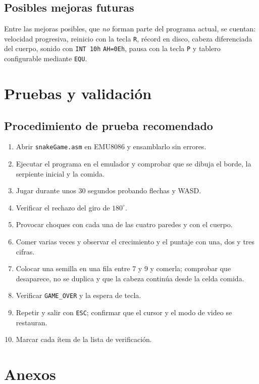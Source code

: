 \documentclass[10pt]{article}
\begin{document}
\subsection{Posibles mejoras futuras}
Entre las mejoras posibles, que \emph{no} forman parte del programa actual, se cuentan: velocidad progresiva, reinicio con la tecla \texttt{R}, récord en disco, cabeza diferenciada del cuerpo, sonido con \texttt{INT 10h} \texttt{AH=0Eh}, pausa con la tecla \texttt{P} y tablero configurable mediante \texttt{EQU}.

\section{Pruebas y validación}

\subsection{Procedimiento de prueba recomendado}
\begin{enumerate}[leftmargin=*]
    \item Abrir \texttt{snakeGame.asm} en EMU8086 y ensamblarlo sin errores.
  \item Ejecutar el programa en el emulador y comprobar que se dibuja el borde, la serpiente inicial y la comida.
  \item Jugar durante unos 30 segundos probando flechas y WASD.
  \item Verificar el rechazo del giro de $180^\circ$.
  \item Provocar choques con cada una de las cuatro paredes y con el cuerpo.
  \item Comer varias veces y observar el crecimiento y el puntaje con una, dos y tres cifras.
    \item Colocar una semilla en una fila entre 7 y 9 y comerla; comprobar que desaparece, no se duplica y que la cabeza continúa desde la celda comida.
  \item Verificar \texttt{GAME\_OVER} y la espera de tecla.
  \item Repetir y salir con \texttt{ESC}; confirmar que el cursor y el modo de video se restauran.
  \item Marcar cada ítem de la lista de verificación.
\end{enumerate}

\section{Anexos}
\end{document}
